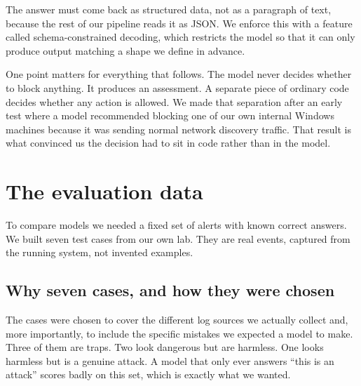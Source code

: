 \documentclass[11pt,a4paper]{article}
\begin{document}
The answer must come back as structured data, not as a paragraph of text, because
the rest of our pipeline reads it as JSON. We enforce this with a feature called
schema-constrained decoding, which restricts the model so that it can only produce
output matching a shape we define in advance.

One point matters for everything that follows. The model never decides whether to
block anything. It produces an assessment. A separate piece of ordinary code decides
whether any action is allowed. We made that separation after an early test where a
model recommended blocking one of our own internal Windows machines because it was
sending normal network discovery traffic. That result is what convinced us the
decision had to sit in code rather than in the model.

\section{The evaluation data}

To compare models we needed a fixed set of alerts with known correct answers.
We built seven test cases from our own lab. They are real events, captured from the
running system, not invented examples.

\subsection{Why seven cases, and how they were chosen}

The cases were chosen to cover the different log sources we actually collect and,
more importantly, to include the specific mistakes we expected a model to make.
Three of them are traps. Two look dangerous but are harmless. One looks harmless but
is a genuine attack. A model that only ever answers ``this is an attack'' scores
badly on this set, which is exactly what we wanted.
\end{document}
